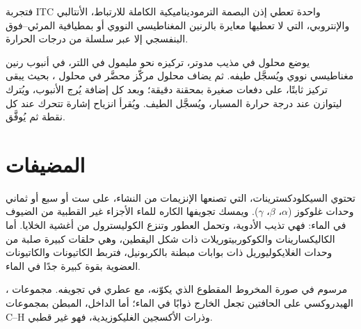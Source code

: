 فتجربة ITC واحدة تعطي إذن البصمة الترموديناميكية الكاملة
للارتباط، الأنتالبي والإنتروبي، التي لا تعطيها معايرة بالرنين المغناطيسي النووي أو بمطيافية المرئي--فوق البنفسجي إلا
عبر سلسلة من درجات الحرارة.

\begin{inthelab}
يوضع محلول  في مذيب مدوتر، تركيزه نحو مليمول في اللتر،
في أنبوب رنين مغناطيسي نووي ويُسجَّل طيفه. ثم يضاف محلول مركّز
 محضَّر في محلول ، بحيث يبقى تركيز 
ثابتًا، على دفعات صغيرة بمحقنة دقيقة؛ وبعد كل إضافة يُرج
الأنبوب، ويُترك ليتوازن عند درجة حرارة المسبار، ويُسجَّل
الطيف. ويُقرأ انزياح إشارة  تتحرك عند كل نقطة ثم
يُوفَّق.
\end{inthelab}

\section{المضيفات}

تحتوي السيكلودكسترينات، التي تصنعها الإنزيمات من النشاء، على ست أو سبع أو ثماني وحدات
غلوكوز ($\alpha$، $\beta$، $\gamma$). ويمسك تجويفها الكاره للماء الأجزاء غير القطبية من الضيوف في
الماء: فهي تذيب الأدوية، وتحمل العطور وتنزع الكوليسترول من
أغشية الخلايا. أما الكاليكسارينات والكوكوربيتوريلات ذات شكل اليقطين، وهي
حلقات كبيرة صلبة من وحدات الغلايكوليوريل ذات بوابات مبطنة بالكربونيل، فتربط الكاتيونات 
والكاتيونات العضوية بقوة كبيرة جدًا في الماء.

\begin{omfigure}

{\small {}، مرسوم في صورة المخروط المقطوع الذي يكوّنه، مع 
عطري في تجويفه. مجموعات الهيدروكسي على الحافتين تجعل الخارج
ذوابًا في الماء؛ أما الداخل، المبطن بمجموعات C--H وذرات الأكسجين الغليكوزيدية، فهو
غير قطبي.}
\end{omfigure}

